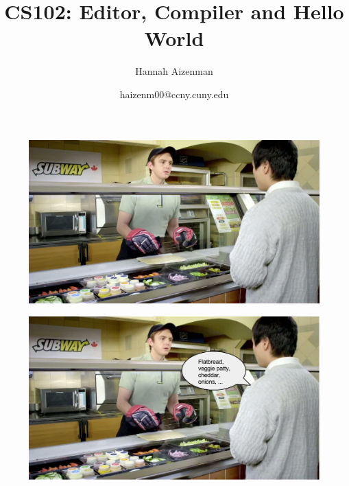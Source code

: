 \documentclass[xcolor={dvipsnames}]{beamer}
\newenvironment{changemargin}[2]{%
\begin{list}{}{%
\setlength{\topsep}{0pt}%
\setlength{\leftmargin}{#1}%
\setlength{\rightmargin}{#2}%
\setlength{\listparindent}{\parindent}%
\setlength{\itemindent}{\parindent}%
\setlength{\parsep}{\parskip}%
}%
\item[]}{\end{list}}
\begin{document}
\title{ CS102: Editor, Compiler and Hello World}
\author{Hannah Aizenman}
\date{haizenm00@ccny.cuny.edu}


\begin{frame}
	\titlepage
\end{frame}

\begin{frame}[plain]	
	\begin{changemargin}{-1cm}{+0cm}
		\begin{figure}
			\includegraphics[width=1.20\textwidth]{subway}
		\end{figure}
	\end{changemargin}
\end{frame}

\begin{frame}[plain]	
	\begin{changemargin}{-1cm}{+0cm}
		\begin{figure}
			\includegraphics[width=1.20\textwidth]{subway_editor}
		\end{figure}
	\end{changemargin}
\end{frame}
\end{document}
